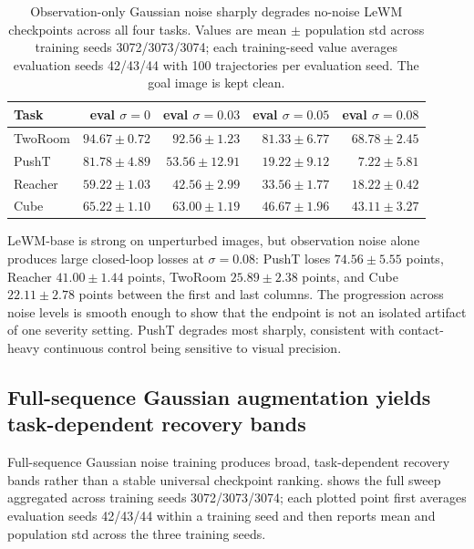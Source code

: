 \documentclass[10pt]{article}
\begin{document}
\begin{table}[htbp]
\centering
\caption{Observation-only Gaussian noise sharply degrades no-noise LeWM checkpoints across all four tasks. Values are mean $\pm$ population std across training seeds 3072/3073/3074; each training-seed value averages evaluation seeds 42/43/44 with 100 trajectories per evaluation seed. The goal image is kept clean.}
\label{tab:noise-cliff}
\small
\setlength{\tabcolsep}{4pt}
\begin{tabular}{lrrrr}
\toprule
Task & eval $\sigma=0$ & eval $\sigma=0.03$ & eval $\sigma=0.05$ & eval $\sigma=0.08$ \\
\midrule
TwoRoom & $94.67 \pm 0.72$ & $92.56 \pm 1.23$ & $81.33 \pm 6.77$ & $68.78 \pm 2.45$ \\
PushT   & $81.78 \pm 4.89$ & $53.56 \pm 12.91$ & $19.22 \pm 9.12$ & $\phantom{0}7.22 \pm 5.81$ \\
Reacher & $59.22 \pm 1.03$ & $42.56 \pm 2.99$ & $33.56 \pm 1.77$ & $18.22 \pm 0.42$ \\
Cube    & $65.22 \pm 1.10$ & $63.00 \pm 1.19$ & $46.67 \pm 1.96$ & $43.11 \pm 3.27$ \\
\bottomrule
\end{tabular}
\end{table}

LeWM-base is strong on unperturbed images, but observation noise alone produces large closed-loop losses at $\sigma=0.08$: PushT loses $74.56 \pm 5.55$ points, Reacher $41.00 \pm 1.44$ points, TwoRoom $25.89 \pm 2.38$ points, and Cube $22.11 \pm 2.78$ points between the first and last columns. The progression across noise levels is smooth enough to show that the endpoint is not an isolated artifact of one severity setting. PushT degrades most sharply, consistent with contact-heavy continuous control being sensitive to visual precision.

\subsection{Full-sequence Gaussian augmentation yields task-dependent recovery bands}\label{sec:exp-sweep}

Full-sequence Gaussian noise training produces broad, task-dependent recovery bands rather than a stable universal checkpoint ranking.  shows the full sweep aggregated across training seeds 3072/3073/3074; each plotted point first averages evaluation seeds 42/43/44 within a training seed and then reports mean and population std across the three training seeds.
\end{document}
